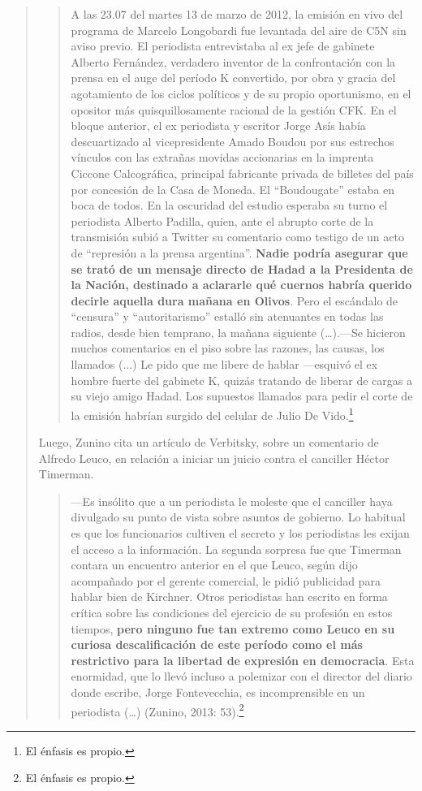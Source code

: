 \begin{quote}
\begin{quote}
	A las 23.07 del martes 13 de marzo de 2012, la emisión en vivo del programa de Marcelo Longobardi fue levantada del aire de C5N sin aviso previo. El periodista entrevistaba al ex jefe de gabinete Alberto Fernández, verdadero inventor de la confrontación con la prensa en el auge del período K convertido, por obra y gracia del agotamiento de los ciclos políticos y de su propio oportunismo, en el opositor más quisquillosamente racional de la gestión CFK. En el bloque anterior, el ex periodista y escritor Jorge Asís había descuartizado al vicepresidente Amado Boudou por sus estrechos vínculos con las extrañas movidas accionarias en la imprenta Ciccone Calcográfica, principal fabricante privada de billetes del país por concesión de la Casa de Moneda. El ``Boudougate'' estaba en boca de todos. En la oscuridad del estudio esperaba su turno el periodista Alberto Padilla, quien, ante el abrupto corte de la transmisión subió a Twitter su comentario como testigo de un acto de ``represión a la prensa argentina''. \textbf{Nadie podría asegurar que se trató de un mensaje directo de Hadad a la Presidenta de la Nación, destinado a aclararle qué cuernos habría querido decirle aquella dura mañana en Olivos}. Pero el escándalo de ``censura'' y ``autoritarismo'' estalló sin atenuantes en todas las radios, desde bien temprano, la mañana siguiente (\dots).---Se hicieron muchos comentarios en el piso sobre las razones, las causas, los llamados (...) Le pido que me libere de hablar ---esquivó el ex hombre fuerte del gabinete K, quizás tratando de liberar de cargas a su viejo amigo Hadad. Los supuestos llamados para pedir el corte de la emisión habrían surgido del celular de Julio De Vido.\footnote{El énfasis es propio.}
\end{quote}


Luego, Zunino cita un artículo de Verbitsky, sobre un comentario de Alfredo Leuco, en relación a iniciar un juicio contra el canciller Héctor Timerman.

\begin{quote}
	---Es insólito que a un periodista le moleste que el canciller haya divulgado su punto de vista sobre asuntos de gobierno. Lo habitual es que los funcionarios cultiven el secreto y los periodistas les exijan el acceso a la información. La segunda sorpresa fue que Timerman contara un encuentro anterior en el que Leuco, según dijo acompañado por el gerente comercial, le pidió publicidad para hablar bien de Kirchner. Otros periodistas han escrito en forma crítica sobre las condiciones del ejercicio de su profesión en estos tiempos, \textbf{pero ninguno fue tan extremo como Leuco en su curiosa descalificación de este período como el más restrictivo para la libertad de expresión en democracia}. Esta enormidad, que lo llevó incluso a polemizar con el director del diario donde escribe, Jorge Fontevecchia, es incomprensible en un periodista (\dots) (Zunino, 2013: 53).\footnote{El énfasis es propio.}
\end{quote}



\end{quote}
